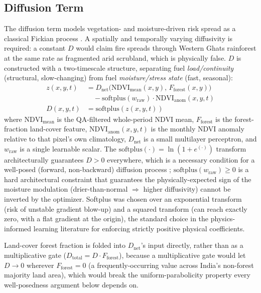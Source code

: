 \documentclass[journal]{IEEEtran}
\begin{document}
\subsection{Diffusion Term}
\label{sec:diffusion}

The diffusion term models vegetation- and moisture-driven risk spread as a classical Fickian process \cite{fick1855,crank1975}. A spatially and temporally varying diffusivity is required: a constant $D$ would claim fire spreads through Western Ghats rainforest at the same rate as fragmented arid scrubland, which is physically false. $D$ is constructed with a two-timescale structure, separating fuel \emph{load/continuity} (structural, slow-changing) from fuel \emph{moisture/stress state} (fast, seasonal):
\begin{align}
z(x,y,t) &= D_{\mathrm{net}}\big(\mathrm{NDVI}_{\mathrm{mean}}(x,y),\, F_{\mathrm{forest}}(x,y)\big) \nonumber\\
&\quad - \mathrm{softplus}(w_{\mathrm{raw}})\cdot \mathrm{NDVI}_{\mathrm{anom}}(x,y,t) \label{eq:D_z}\\
D(x,y,t) &= \mathrm{softplus}(z(x,y,t)) \label{eq:D_softplus}
\end{align}
where $\mathrm{NDVI}_{\mathrm{mean}}$ is the QA-filtered whole-period NDVI mean, $F_{\mathrm{forest}}$ is the forest-fraction land-cover feature, $\mathrm{NDVI}_{\mathrm{anom}}(x,y,t)$ is the monthly NDVI anomaly relative to that pixel's own climatology, $D_{\mathrm{net}}$ is a small multilayer perceptron, and $w_{\mathrm{raw}}$ is a single learnable scalar. The $\mathrm{softplus}(\cdot)=\ln(1+e^{(\cdot)})$ transform architecturally guarantees $D>0$ everywhere, which is a necessary condition for a well-posed (forward, non-backward) diffusion process \cite{evans2010}; $\mathrm{softplus}(w_{\mathrm{raw}})\geq 0$ is a hard architectural constraint that guarantees the physically-expected sign of the moisture modulation (drier-than-normal $\Rightarrow$ higher diffusivity) cannot be inverted by the optimizer. Softplus was chosen over an exponential transform (risk of unstable gradient blow-up) and a squared transform (can reach exactly zero, with a flat gradient at the origin), the standard choice in the physics-informed learning literature for enforcing strictly positive physical coefficients.

Land-cover forest fraction is folded into $D_{\mathrm{net}}$'s input directly, rather than as a multiplicative gate ($D_{\mathrm{total}}=D\cdot F_{\mathrm{forest}}$), because a multiplicative gate would let $D\to0$ wherever $F_{\mathrm{forest}}=0$ (a frequently-occurring value across India's non-forest majority land area), which would break the uniform-parabolicity property every well-posedness argument below depends on.
\end{document}
